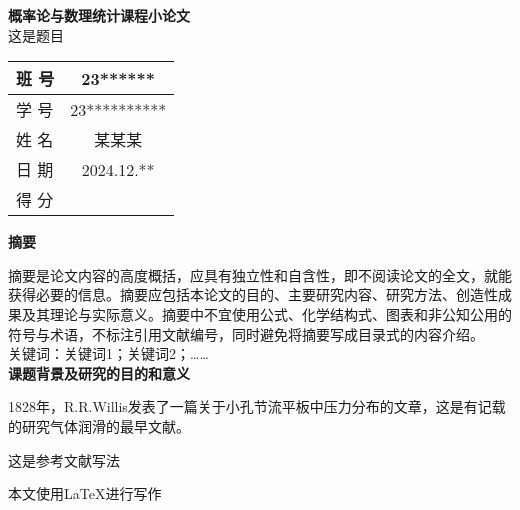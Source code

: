 \documentclass{article}
\begin{document}
{\centering{}
    \textbf{概率论与数理统计课程小论文} \\
    \vspace*{1em}
    {\heiti 这是题目} \\
}
\vspace*{8em}
\begin{center}
    {\bfseries{}
        \begin{tabular}{|>{\centering\arraybackslash}m{3cm}|c|}
            \hline
            班 \quad 号  & 23******   \\
            \hline
            学 \quad 号 & 23********** \\
            \hline
            姓 \quad 名 & 某某某        \\
            \hline
            日 \quad 期 & 2024.12.** \\
            \hline
            得 \quad 分 &            \\
            \hline
        \end{tabular}
    }
\end{center}
\newpage
{\centering
    \bfseries{}\heiti 摘\quad 要\par
}

摘要是论文内容的高度概括，应具有独立性和自含性，即不阅读论文的全文，就能获得必要的信息。摘要应包括本论文的目的、主要研究内容、研究方法、创造性成果及其理论与实际意义。摘要中不宜使用公式、化学结构式、图表和非公知公用的符号与术语，不标注引用文献编号，同时避免将摘要写成目录式的内容介绍。\\ 

关键词：关键词1；关键词2；…… \\

{
\noindent\textbf{课题背景及研究的目的和意义} \\
}

1828年，R.R.Willis发表了一篇关于小孔节流平板中压力分布的文章，这是有记载的研究气体润滑的最早文献。

这是参考文献写法\cite{fenbuhanshu}

\newpage
\printbibliography
\vfill
\begin{center}
    本文使用\LaTeX 进行写作
\end{center}
\end{document}
